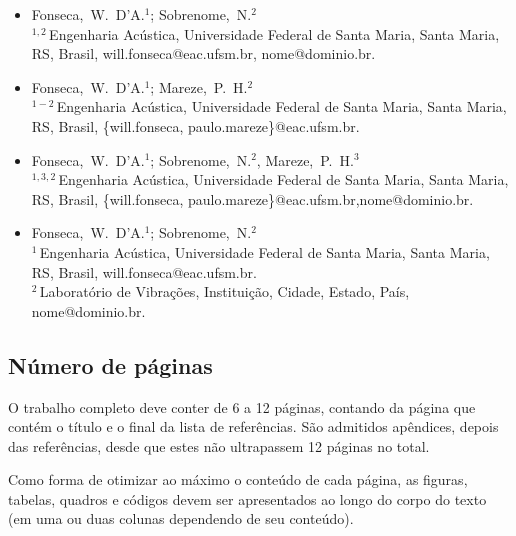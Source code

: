 \documentclass[12pt, a4paper, twoside, twocolumn]{article}
\begin{document}
\begin{flushleft}
\vspace{-0.7\baselineskip}
\begin{itemize}[topsep=-1ex,align=left,leftmargin=0.2cm] \itemsep=4pt

	\item Fonseca,~W.~D'A.$^1$; Sobrenome,~N.$^2$\\[6pt]	
	$^{1,2}$\,Engenharia Acústica, Universidade Federal de Santa Maria, Santa Maria, RS, Brasil,\linebreak 
	 will.fonseca@eac.ufsm.br, nome@dominio.br.
	
	\item Fonseca,~W.~D'A.$^1$; Mareze,~P.~H.$^2$\\[6pt]	
	$^{1-2}$\,Engenharia Acústica, Universidade Federal de Santa Maria, Santa Maria, RS, Brasil,
	\{will.fonseca, paulo.mareze\}@eac.ufsm.br.
	
	\item Fonseca,~W.~D'A.$^1$; Sobrenome,~N.$^2$, Mareze,~P.~H.$^3$\\[6pt]	
	$^{1,3,2}$\,Engenharia Acústica, Universidade Federal de Santa Maria, Santa Maria, RS, Brasil,
	\{will.fonseca, paulo.mareze\}@eac.ufsm.br,\linebreak nome@dominio.br.

	\item Fonseca,~W.~D'A.$^1$; Sobrenome,~N.$^2$\\[6pt]	
	$^{1}$\,Engenharia Acústica, Universidade Federal de Santa Maria, Santa Maria, RS, Brasil,
	will.fonseca@eac.ufsm.br.\\[4pt]		
	$^2$\,Laboratório de Vibrações, Instituição, Cidade, Estado, País, nome@dominio.br.	
\end{itemize}
\vspace{-0.4\baselineskip}
\end{flushleft}

	
\subsection{Número de páginas}

O trabalho completo deve conter de 6 a 12 páginas, contando da  página que contém o título e o final da lista de referências. São admitidos apêndices, depois das referências, desde que estes não ultrapassem 12 páginas no total. 

Como forma de otimizar ao máximo o conteúdo de cada página, as figuras, tabelas, quadros e códigos devem ser apresentados ao longo do corpo do texto (em uma ou duas colunas dependendo de seu conteúdo).
\end{document}
